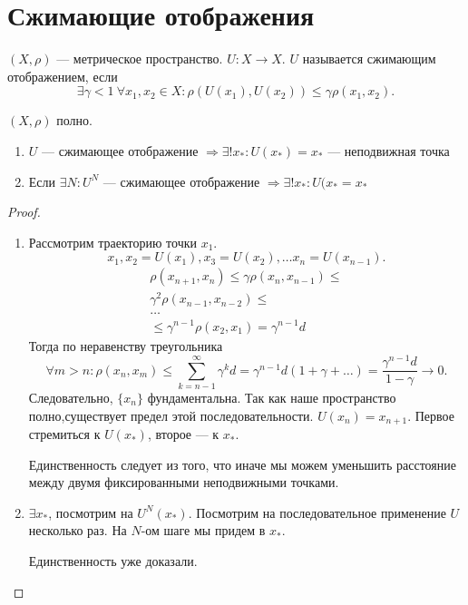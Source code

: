\section{Сжимающие отображения}
\begin{defn}
    $ (X, \rho)$ --- метрическое пространство. $ U: X \to  X$. $ U$ называется {\sf сжимающим отображением}, если
    \[
	\exists   \gamma < 1 ~ \forall  x_1, x_2 \in X\colon \rho(U(x_1), U(x_2)) \le  \gamma \rho(x_1, x_2)
    .\]
\end{defn}
\begin{thm}
    $ (X, \rho)$ полно.
    $ $
    \begin{enumerate}
	\item $ U$ --- сжимающее отображение $ \Longrightarrow \exists! x_{*} \colon U(x_*) = x_{*}$ --- неподвижная точка
	\item Если  $ \exists  N \colon U^{N}$ --- сжимающее отображение $ \Longrightarrow \exists  ! x_{*} \colon U(x_{*} = x_{*}$
    \end{enumerate}
\end{thm}
\begin{proof}
    $ $
    \begin{enumerate}
	\item  Рассмотрим траекторию точки $ x_1$.
	    \[
		x_1, x_2=U(x_1), x_3=U(x_2), \ldots x_n = U(x_{n-1})
	    .\]
	    \begin{align*}
		\rho(x_{n+1}, x_{n}) \le  \gamma \rho(x_n, x_{n-1}) \le  \\
		\gamma^2 \rho(x_{n-1}, x_{n-2}) \le  \\
		\ldots \\
		\le \gamma^{n-1} \rho(x_2, x_1) = \gamma^{n-1}d
	    \end{align*}
	    Тогда по неравенству треугольника
	    \[
		\forall m > n\colon \rho(x_n, x_m) \le \sum^{\infty}_{k=n-1} \gamma^{k}d = \gamma ^{n-1}d(1 + \gamma+ \ldots ) = \frac{\gamma^{n-1} d}{1-\gamma} \longrightarrow 0
	    .\]
	    Следовательно, $ \{x_n\}$ фундаментальна. Так как наше пространство полно,существует предел этой последовательности.
	    $ U(x_{n}) = x_{n+1}$. Первое стремиться к  $ U(x_{*})$, второе --- к $ x_*$.

	    Единственность следует из того, что иначе мы можем уменьшить расстояние между двумя фиксированными неподвижными точками.
	\item $ \exists x_*$, посмотрим на $ U^{N}(x_*)$. Посмотрим на последовательное применение $ U$ несколько раз. На $ N $-ом шаге мы придем в  $ x_*$.

	    Единственность уже доказали.
    \end{enumerate}
\end{proof}
